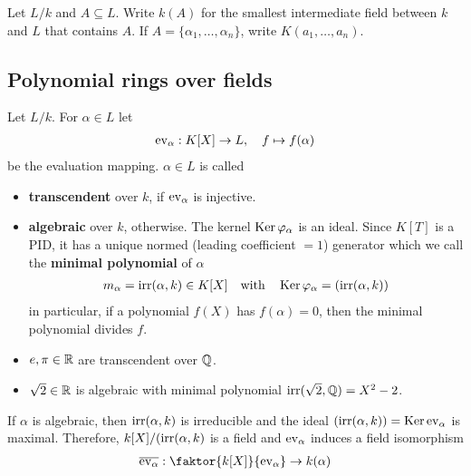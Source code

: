 \begin{dfn}[]
Let $L/k$ and $A \subseteq L$.
Write $k(A)$ for the smallest intermediate field between $k$ and $L$ that contains $A$.
If $A = \{\alpha_{1}, \ldots, \alpha_{n}\}$, write $K(a_{1}, \ldots, a_{n})$.
\end{dfn}

\subsection{Polynomial rings over fields}
\begin{dfn}[]
  Let $L/k$. For $\alpha \in L$ let
  \begin{align*}
    \operatorname{ev}_{\alpha} : K[X] \to L, \quad f \mapsto f(\alpha)
  \end{align*}
  be the evaluation mapping. $\alpha \in L$ is called
  \begin{itemize}
    \item \textbf{transcendent} over $k$, if $\operatorname{ev}_{\alpha}$ is injective.
    \item \textbf{algebraic} over $k$, otherwise.
      The kernel $\operatorname{Ker} \varphi_{\alpha}$ is an ideal.
      Since $K[T]$ is a PID, it has a unique normed (leading coefficient $=1$) generator which we call the \textbf{minimal polynomial} of $\alpha$
      \begin{align*}
        m_{\alpha} = \text{irr}(\alpha,k) \in K[X]
        \quad \text{with} \quad \operatorname{Ker} \varphi_{\alpha} = (\text{irr}(\alpha,k))
      \end{align*}
      in particular, if a polynomial $f(X)$ has $f(\alpha) = 0$, then the minimal polynomial divides $f$.
  \end{itemize}
\end{dfn}

\begin{itemize}
  \item $e,\pi \in \mathbb{R}$ are transcendent over $\mathbb{Q}$.
  \item $\sqrt{2} \in \mathbb{R}$ is algebraic with minimal polynomial $\text{irr}(\sqrt{2},\mathbb{Q}) = X^{2} - 2$.
\end{itemize}

If $\alpha$ is algebraic, then $\operatorname{irr}(\alpha,k)$ is irreducible and the ideal $(\operatorname{irr}(\alpha,k)) = \operatorname{Ker} \operatorname{ev}_{\alpha}$ is maximal.
Therefore, $k[X]/(\operatorname{irr}(\alpha,k)$ is a field and $\operatorname{ev}_{\alpha}$ induces a field isomorphism
\begin{align*}
  \overline{\ev_{\alpha}} : \faktor{k[X]}{\ev_{\alpha}} \to k(\alpha)
\end{align*}



